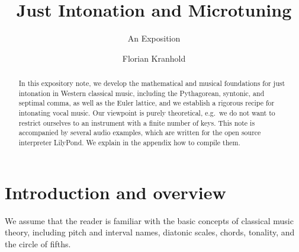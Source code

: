\documentclass[british,11pt]{scrartcl}
\title     {Just Intonation and Microtuning}
\author    {Florian Kranhold}
\subtitle  {An Exposition}
\begin{document}
\maketitle

\begin{abstract}
  In this expository note, we develop the mathematical and musical foundations
  for just intonation in Western classical music, including the Pythagorean,
  syntonic, and septimal comma, as well as the Euler lattice, and we establish a
  rigorous recipe for intonating vocal music.  Our viewpoint is purely
  theoretical, e.g.\ we do not want to restrict ourselves to an instrument with
  a finite number of keys.  This note is accompanied by several audio examples,
  which are written for the open source interpreter LilyPond. We explain in the
  appendix how to compile them.
\end{abstract}

\section{Introduction and overview}

We assume that the reader is familiar with the basic concepts of classical music
theory, including pitch and interval names, diatonic scales, chords, tonality,
and the circle of fifths.
\end{document}
